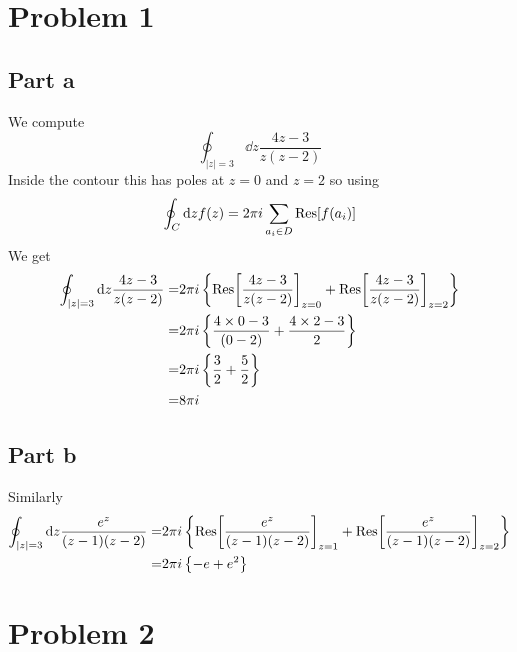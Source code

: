 \documentclass[a4paper,12pt]{article}
\begin{document}
\section*{Problem 1}
\subsection*{Part a}
We compute
\begin{equation}
\oint_{|z|=3} \dd z\frac{4z-3}{z(z-2)}
\end{equation}
Inside the contour this has poles at $z=0$ and $z=2$ so using 
\begin{equation}
	\oint _C \dd z  f(z)=2\pi i \sum_{a_i\in D}\Res[f(a_i)]
\end{equation}
We get
\begin{equation}
\begin{aligned}
	\oint_{|z|=3} \dd z\frac{4z-3}{z(z-2)}=&2\pi i \left\{\Res[\frac{4z-3}{z(z-2)}]_{z=0}+\Res[\frac{4z-3}{z(z-2)}]_{z=2}\right\}\\
	=&2\pi i \left\{\frac{4\times 0-3}{(0-2)}+\frac{4\times 2-3}{2}\right\}\\
	=&2\pi i \left\{\frac{3}{2}+\frac{5}{2}\right\}\\	
	=&8\pi i 
\end{aligned}
\end{equation}
\subsection*{Part b}
Similarly
\begin{equation}
	\begin{aligned}
		\oint_{|z|=3} \dd z\frac{e^z}{(z-1)(z-2)}=&2\pi i \left\{\Res[\frac{e^z}{(z-1)(z-2)}]_{z=1}+\Res[\frac{e^z}{(z-1)(z-2)}]_{z=2}\right\}\\
		=&2\pi i \left\{-e+e^2\right\}\\
	\end{aligned}
\end{equation}
\section*{Problem 2}
\end{document}
